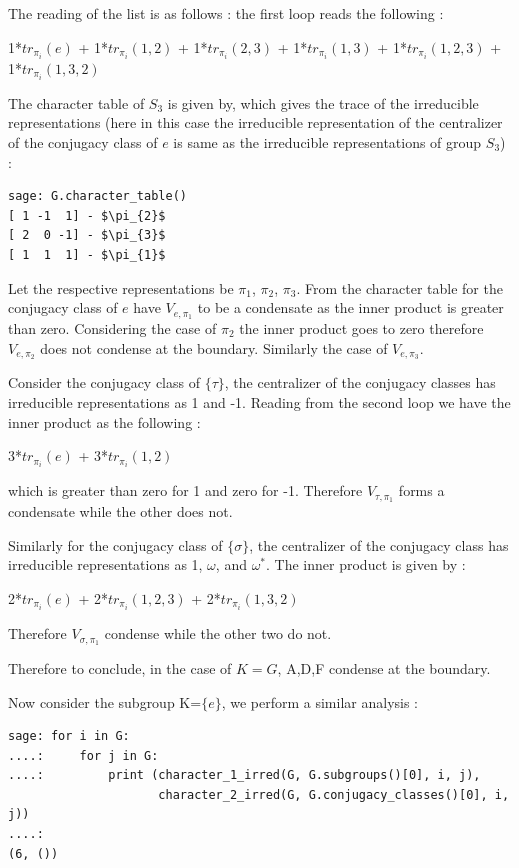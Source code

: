 The reading of the list is as follows : the first loop reads the following :  
\begin{center}
1*$tr_{\pi_{i}}(e)$ + 1*$tr_{\pi_{i}}(1,2)$ + 1*$tr_{\pi_{i}}(2,3)$ + 1*$tr_{\pi_{i}}(1,3)$ + 1*$tr_{\pi_{i}}(1,2,3)$ + 1*$tr_{\pi_{i}}(1,3,2)$
\end{center}

The character table of $S_{3}$ is given by, which gives the trace of the irreducible representations (here in this case the irreducible representation 
of the centralizer of the conjugacy class of $e$ is same as the irreducible representations of group $S_{3}$) :

\begin{lstlisting}[frame=single]
sage: G.character_table()
[ 1 -1  1] - $\pi_{2}$
[ 2  0 -1] - $\pi_{3}$
[ 1  1  1] - $\pi_{1}$
\end{lstlisting}

Let the respective representations be $\pi_{1}$, $\pi_{2}$, $\pi_{3}$.
From the character table for the conjugacy class of $e$ have $V_{e, \pi_{1}}$ to be a condensate as the inner product is greater than zero.
Considering the  case of $\pi_{2}$ the inner product goes to zero therefore $V_{e, \pi_{2}}$ does not condense at the boundary. Similarly the case of 
$V_{e, \pi_{3}}$.

Consider the conjugacy class of $\{\tau\}$, the centralizer of the conjugacy classes has irreducible representations as 1 and -1. Reading from the 
second loop we have the inner product as the following :
\begin{center}
3*$tr_{\pi_{i}}(e)$ + 3*$tr_{\pi_{i}}(1,2)$
\end{center}
which	 is greater than zero for 1 and zero for -1. Therefore $V_{\tau, \pi_{1}}$ forms a condensate while the other does not.

Similarly for the conjugacy class of $\{\sigma\}$, the centralizer of the conjugacy class has irreducible representations as 1, $\omega$, and $\omega^{*}$.
The inner product is given by :
\begin{center}
2*$tr_{\pi_{i}}(e)$ + 2*$tr_{\pi_{i}}(1,2,3)$ + 2*$tr_{\pi_{i}}(1,3,2)$
\end{center}
Therefore $V_{\sigma, \pi_{1}}$ condense while the other two do not.

Therefore to conclude, in the case of $K=G$, A,D,F condense at the boundary. 

Now consider the subgroup K=$\{e\}$, we perform a similar analysis :

\begin{lstlisting}[frame=single]
sage: for i in G:
....:     for j in G:
....:         print (character_1_irred(G, G.subgroups()[0], i, j), 
                     character_2_irred(G, G.conjugacy_classes()[0], i, j))
....: 
(6, ())
\end{lstlisting}

